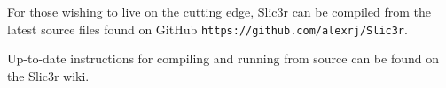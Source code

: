 For those wishing to live on the cutting edge, Slic3r can be compiled from the latest source files found on GitHub \texttt{https://github.com/alexrj/Slic3r}.

Up-to-date instructions for compiling and running from source can be found on the Slic3r wiki.


